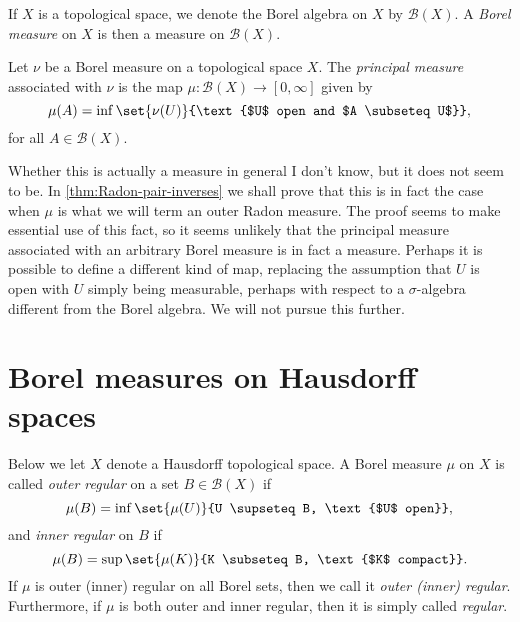 \documentclass[article, a4paper, 11pt, oneside]{memoir}
\numberwithin{equation}{chapter}
\newcommand{\calB}{\mathcal{B}}
\newcommand{\borel}[1]{\calB(#1)}
\begin{document}
If $X$ is a topological space, we denote the Borel algebra on $X$ by $\borel{X}$. A \emph{Borel measure} on $X$ is then a measure on $\borel{X}$.

\begin{definition}
    Let $\nu$ be a Borel measure on a topological space $X$. The \emph{principal measure}\footnotemark{} associated with $\nu$ is the map $\mu \colon \borel{X} \to [0,\infty]$ given by
    \begin{equation*}
        \mu(A)
            = \inf \set{\nu(U)}{\text{$U$ open and $A \subseteq U$}},
    \end{equation*}
    for all $A \in \borel{X}$.
\end{definition}
%
Whether this is actually a measure in general I don't know, but it does not seem to be. In \cref{thm:Radon-pair-inverses} we shall prove that this is in fact the case when $\mu$ is what we will term an outer Radon measure. The proof seems to make essential use of this fact, so it seems unlikely that the principal measure associated with an arbitrary Borel measure is in fact a measure. Perhaps it is possible to define a different kind of map, replacing the assumption that $U$ is open with $U$ simply being measurable, perhaps with respect to a $\sigma$-algebra different from the Borel algebra. We will not pursue this further.


\section{Borel measures on Hausdorff spaces}

Below we let $X$ denote a Hausdorff topological space. A Borel measure $\mu$ on $X$ is called \emph{outer regular} on a set $B \in \borel{X}$ if
%
\begin{equation*}
    \mu(B)
        = \inf \set{\mu(U)}{U \supseteq B, \text{$U$ open}},
\end{equation*}
%
and \emph{inner regular} on $B$ if
%
\begin{equation*}
    \mu(B)
        = \sup \set{\mu(K)}{K \subseteq B, \text{$K$ compact}}.
\end{equation*}
%
If $\mu$ is outer (inner) regular on all Borel sets, then we call it \emph{outer (inner) regular}. Furthermore, if $\mu$ is both outer and inner regular, then it is simply called \emph{regular}.
\end{document}
